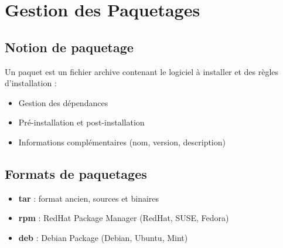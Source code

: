\documentclass[12pt,a4paper]{article}
\begin{document}

\section{Gestion des Paquetages}


\subsection{Notion de paquetage}
Un paquet est un fichier archive contenant le logiciel \`a installer et des r\`egles d'installation :
\begin{itemize}
    \item Gestion des d\'ependances
    \item Pr\'e-installation et post-installation
    \item Informations compl\'ementaires (nom, version, description)
\end{itemize}

\subsection{Formats de paquetages}
\begin{itemize}
    \item \textbf{tar} : format ancien, sources et binaires
    \item \textbf{rpm} : RedHat Package Manager (RedHat, SUSE, Fedora)
    \item \textbf{deb} : Debian Package (Debian, Ubuntu, Mint)
\end{itemize}

\end{document}
